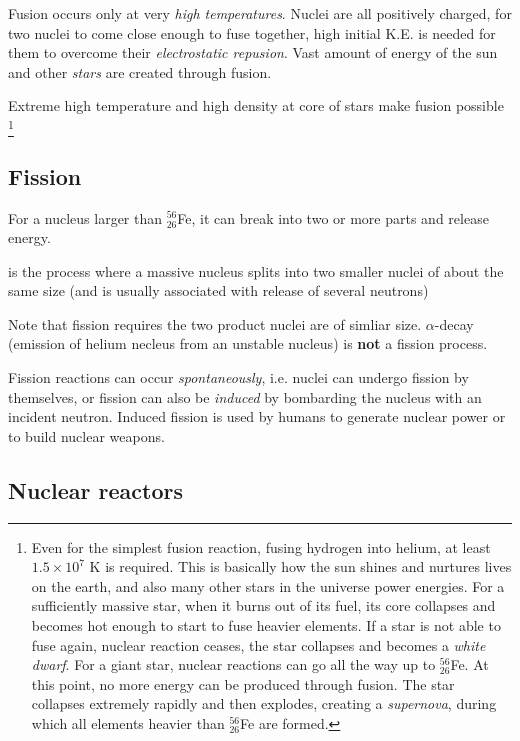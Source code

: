 Fusion occurs only at very \emph{high temperatures}. Nuclei are all positively charged, for two nuclei to come close enough to fuse together, high initial K.E. is needed for them to overcome their \emph{electrostatic repusion}. Vast amount of energy of the sun and other \emph{stars} are created through fusion.

Extreme high temperature and high density at core of stars make fusion possible
\footnote{Even for the simplest fusion reaction, fusing hydrogen into helium, at least $1.5\times 10^7 \text{ K}$ is required. This is basically how the sun shines and nurtures lives on the earth, and also many other stars in the universe power energies. For a sufficiently massive star, when it burns out of its fuel, its core collapses and becomes hot enough to start to fuse heavier elements. If a star is not able to fuse again, nuclear reaction ceases, the star collapses and becomes a \emph{white dwarf}. For a giant star, nuclear reactions can go all the way up to $^{56}_{26}$Fe. At this point, no more energy can be produced through fusion. The star collapses extremely rapidly and then explodes, creating a \emph{supernova}, during which all elements heavier than $^{56}_{26}$Fe are formed. \piste}


\subsection{Fission}

For a nucleus larger than $^{56}_{26}$Fe, it can break into two or more parts and release energy.

\begin{ilight}
	 is the process where a massive nucleus splits into two smaller nuclei of about the same size (and is usually associated with release of several neutrons)
\end{ilight}

Note that fission requires the two product nuclei are of simliar size. $\alpha$-decay (emission of helium necleus from an unstable nucleus) is \textbf{not} a fission process.

Fission reactions can occur \emph{spontaneously}, i.e. nuclei can undergo fission by themselves, or fission can also be \emph{induced} by bombarding the nucleus with an incident neutron. Induced fission is used by humans to generate nuclear power or to build nuclear weapons.

\subsection*{Nuclear reactors \piste}

